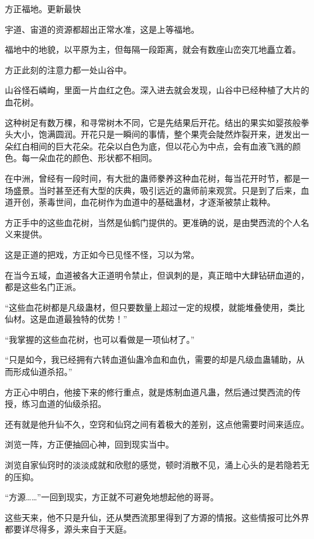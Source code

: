 
\begin{this_body}

方正福地。更新最快

宇道、宙道的资源都超出正常水准，这是上等福地。

福地中的地貌，以平原为主，但每隔一段距离，就会有数座山峦突兀地矗立着。

方正此刻的注意力都一处山谷中。

山谷怪石嶙峋，里面一片血红之色。深入进去就会发现，山谷中已经种植了大片的血花树。

这种树足有数万棵，和寻常树木不同，它是先结果后开花。结出的果实如婴孩般拳头大小，饱满圆润。开花只是一瞬间的事情，整个果壳会陡然炸裂开来，迸发出一朵红白相间的巨大花朵。花朵以白色为底，但以花心为中点，会有血液飞溅的颜色。每一朵血花的颜色、形状都不相同。

在中洲，曾经有一段时间，有大批的蛊师豢养这种血花树，每当花开时节，都是一场盛景。当时甚至还有大型的庆典，吸引远近的蛊师前来观赏。只是到了后来，血道开创，荼毒世间，血花树作为血道中的基础蛊材，才逐渐被禁止栽种。

方正手中的这些血花树，当然是仙鹤门提供的。更准确的说，是由樊西流的个人名义来提供。

这是正道的把戏，方正如今已见怪不怪，习以为常。

在当今五域，血道被各大正道明令禁止，但讽刺的是，真正暗中大肆钻研血道的，都是这些名门正派。

“这些血花树都是凡级蛊材，但只要数量上超过一定的规模，就能堆叠使用，类比仙材。这是血道最独特的优势！”

“我掌握的这些血花树，也可以看做是一项仙材了。”

“只是如今，我已经拥有六转血道仙蛊冷血和血仇，需要的却是凡级血蛊辅助，从而形成仙道杀招。”

方正心中明白，他接下来的修行重点，就是炼制血道凡蛊，然后通过樊西流的传授，练习血道的仙级杀招。

还有就是他升仙不久，空窍和仙窍之间有着极大的差别，这点他需要时间来适应。

浏览一阵，方正便抽回心神，回到现实当中。

浏览自家仙窍时的淡淡成就和欣慰的感觉，顿时消散不见，涌上心头的是若隐若无的压抑。

“方源……”一回到现实，方正就不可避免地想起他的哥哥。

这些天来，他不只是升仙，还从樊西流那里得到了方源的情报。这些情报可比外界都要详尽得多，源头来自于天庭。


\end{this_body}
